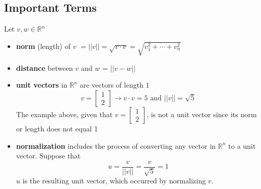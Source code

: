 \subsection{Important Terms}
Let $v, w \in \mathbb{R}^n$
\begin{itemize}
  \item \textbf{norm} (length) of $v$ $= ||v|| = \sqrt{v \cdot v} = \sqrt{v_1^2 + \cdots + v_n^2}$
  \item \textbf{distance} between $v$ and $w$ = $||v - w||$
  \item \textbf{unit vectors} in $\mathbb{R}^n$ are vectors of length $1$
  \[
    v = \begin{bmatrix} 1 \\ 2 \end{bmatrix} \rightarrow v \cdot v = 5 \text{  and  } ||v|| = \sqrt{5}
  \]
  The example above, given that $v = \begin{bmatrix} 1 \\ 2 \end{bmatrix}$, is not a unit vector since its 
  norm or length does not equal 1
  \item \textbf{normalization} includes the process of converting any vector in $\mathbb{R}^n$ to a unit vector. Suppose that 
  \[
    u = \frac{v}{||v||} = \frac{v}{\sqrt{5}} = 1
  \]
$u$ is the resulting unit vector, which occurred by normalizing $v$.
\end{itemize}
